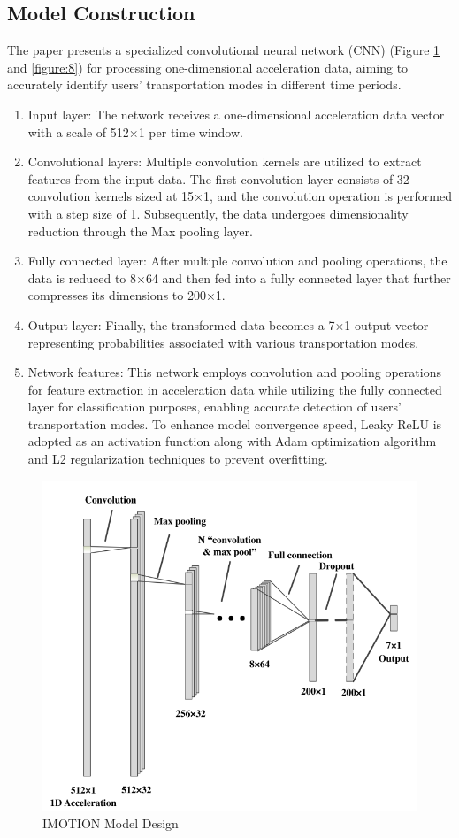 \documentclass[12pt,two side]{report}
\begin{document}
\subsection{Model Construction}
The paper presents a specialized convolutional neural network (CNN) (Figure \ref{figure:7} and \ref{figure:8}) for processing one-dimensional acceleration data, aiming to accurately identify users' transportation modes in different time periods.
\begin{enumerate}
    \item Input layer: The network receives a one-dimensional acceleration data vector with a scale of 512×1 per time window.
    \item Convolutional layers: Multiple convolution kernels are utilized to extract features from the input data. The first convolution layer consists of 32 convolution kernels sized at 15×1, and the convolution operation is performed with a step size of 1. Subsequently, the data undergoes dimensionality reduction through the Max pooling layer.
    \item Fully connected layer: After multiple convolution and pooling operations, the data is reduced to 8×64 and then fed into a fully connected layer that further compresses its dimensions to 200×1.
    \item Output layer: Finally, the transformed data becomes a 7×1 output vector representing probabilities associated with various transportation modes.
    \item Network features: This network employs convolution and pooling operations for feature extraction in acceleration data while utilizing the fully connected layer for classification purposes, enabling accurate detection of users' transportation modes. To enhance model convergence speed, Leaky ReLU is adopted as an activation function along with Adam optimization algorithm and L2 regularization techniques to prevent overfitting.
\end{enumerate}
\begin{figure}
\centering
\includegraphics[width=12cm]{background_report/figures/model.png}
\caption{IMOTION Model Design}
\label{figure:7}
\end{figure}
\end{document}
